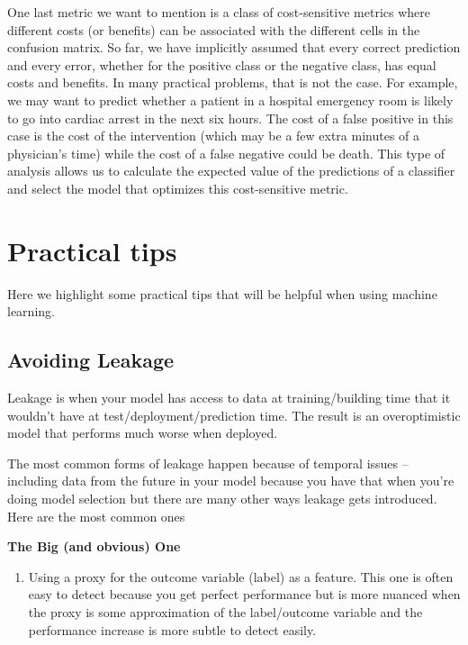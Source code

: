 \documentclass[]{krantz}
\providecommand{\tightlist}{%
  \setlength{\itemsep}{0pt}\setlength{\parskip}{0pt}}
\begin{document}
One last metric we want to mention is a class of cost-sensitive metrics
where different costs (or benefits) can be associated with the different
cells in the confusion matrix. So far, we have implicitly assumed that
every correct prediction and every error, whether for the positive class
or the negative class, has equal costs and benefits. In many practical
problems, that is not the case. For example, we may want to predict
whether a patient in a hospital emergency room is likely to go into
cardiac arrest in the next six hours. The cost of a false positive in
this case is the cost of the intervention (which may be a few extra
minutes of a physician's time) while the cost of a false negative could
be death. This type of analysis allows us to calculate the expected
value of the predictions of a classifier and select the model that
optimizes this cost-sensitive metric.

\section{Practical tips}\label{practical-tips}

Here we highlight some practical tips that will be helpful when using
machine learning.

\subsection{Avoiding Leakage}\label{avoiding-leakage}

Leakage is when your model has access to data at training/building time
that it wouldn't have at test/deployment/prediction time. The result is
an overoptimistic model that performs much worse when deployed.

The most common forms of leakage happen because of temporal issues --
including data from the future in your model because you have that when
you're doing model selection but there are many other ways leakage gets
introduced. Here are the most common ones

\textbf{The Big (and obvious) One}

\begin{enumerate}
\def\labelenumi{\arabic{enumi}.}
\tightlist
\item
  Using a proxy for the outcome variable (label) as a feature. This one
  is often easy to detect because you get perfect performance but is
  more nuanced when the proxy is some approximation of the label/outcome
  variable and the performance increase is more subtle to detect easily.
\end{enumerate}
\end{document}
